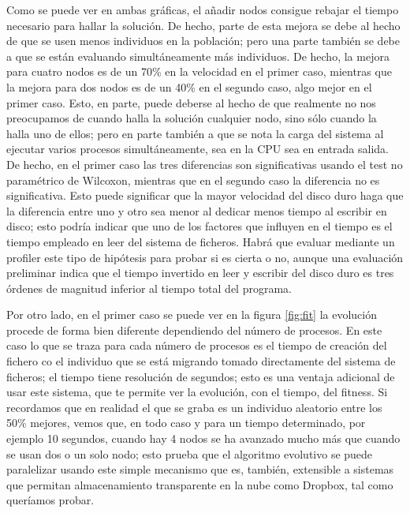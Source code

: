 \documentclass{article}
\begin{document}
Como se puede ver en ambas gráficas, el añadir nodos consigue rebajar
el tiempo necesario para hallar la solución. De hecho, parte de esta
mejora se debe al hecho de que se usen menos individuos en la
población; pero una parte también se debe a que se están evaluando
simultáneamente más individuos. De hecho, la mejora para cuatro nodos
es de un 70\% en la velocidad en el primer caso, mientras que la
mejora para dos nodos es de un 40\% en el segundo caso, algo mejor en
el primer caso. Esto, en parte, puede deberse al hecho de que
realmente no nos preocupamos de cuando halla la solución cualquier
nodo, sino sólo cuando la halla uno de ellos; pero en parte también a
que se nota la carga del sistema al ejecutar varios procesos
simultáneamente, sea en la CPU sea en entrada salida.   %
De hecho, en el
primer caso las tres diferencias son significativas usando el test no
paramétrico de Wilcoxon, mientras que en el segundo caso la diferencia
no es significativa. Esto puede significar que la mayor velocidad del
disco duro haga que la diferencia entre uno y otro sea menor al
dedicar menos tiempo al escribir en disco; esto podría indicar que uno
de los factores que influyen en el tiempo es el tiempo empleado en
leer del sistema de ficheros. Habrá que evaluar mediante un profiler  %
este tipo de hipótesis para probar si es cierta o no, aunque una
evaluación preliminar indica que el tiempo invertido en leer y
escribir del disco duro es tres órdenes de magnitud inferior al tiempo
total del programa. 

Por otro lado, en el primer caso se puede ver en la figura
\ref{fig:fit} la evolución procede de forma bien diferente dependiendo
del número de procesos. En este caso lo que se traza para cada número
de procesos es el tiempo de creación del fichero co el individuo que
se está migrando tomado directamente del sistema de ficheros; el
tiempo tiene resolución de segundos; esto es una ventaja adicional de
usar este sistema, que te permite ver la evolución, con el tiempo, del
fitness. Si recordamos que en realidad el que se graba es un individuo
aleatorio entre los 50\% mejores, vemos que, en todo caso y para un
tiempo determinado, por ejemplo 10 segundos, cuando hay 4 nodos se ha
avanzado mucho más que cuando se usan dos o un solo nodo; esto prueba
que el algoritmo evolutivo se puede paralelizar usando este simple
mecanismo que es, también, extensible a sistemas que permitan
almacenamiento transparente en la nube como Dropbox, tal como
queríamos probar.
\end{document}
